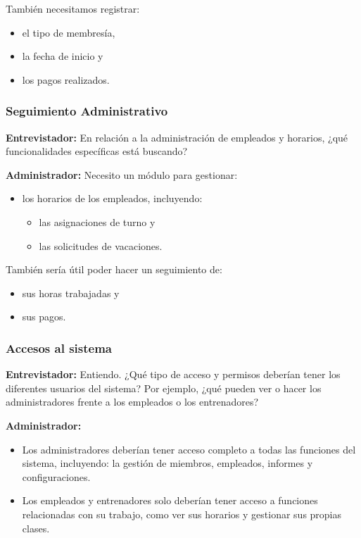 \documentclass[spanish,12pt]{article}
\providecommand{\tightlist}{\setlength{\itemsep}{0pt}\setlength{\parskip}{0pt}}
\begin{document}
También necesitamos registrar:

\begin{itemize}
\tightlist
\item
  el tipo de membresía,
\item
  la fecha de inicio y
\item
  los pagos realizados.
\end{itemize}

\subsubsection{Seguimiento
Administrativo}\label{seguimiento-administrativo}

\textbf{Entrevistador:} En relación a la administración de empleados y
horarios, ¿qué funcionalidades específicas está buscando?

\textbf{Administrador:} Necesito un módulo para gestionar:

\begin{itemize}
\tightlist
\item
  los horarios de los empleados, incluyendo:

  \begin{itemize}
  \tightlist
  \item
    las asignaciones de turno y
  \item
    las solicitudes de vacaciones.
  \end{itemize}
\end{itemize}

También sería útil poder hacer un seguimiento de:

\begin{itemize}
\tightlist
\item
  sus horas trabajadas y
\item
  sus pagos.
\end{itemize}

\subsubsection{Accesos al sistema}\label{accesos-al-sistema}

\textbf{Entrevistador:} Entiendo. ¿Qué tipo de acceso y permisos
deberían tener los diferentes usuarios del sistema? Por ejemplo, ¿qué
pueden ver o hacer los administradores frente a los empleados o los
entrenadores?

\textbf{Administrador:}

\begin{itemize}
\tightlist
\item
  Los administradores deberían tener acceso completo a todas las
  funciones del sistema, incluyendo: la gestión de miembros, empleados,
  informes y configuraciones.
\item
  Los empleados y entrenadores solo deberían tener acceso a funciones
  relacionadas con su trabajo, como ver sus horarios y gestionar sus
  propias clases.
\end{itemize}
\end{document}
